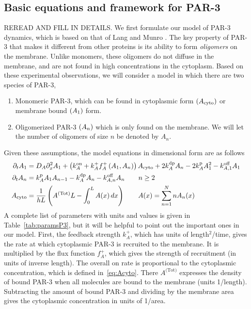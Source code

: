 \documentclass[11pt]{article}
\newcommand{\red}[1]{\color{red}#1\normalcolor}
\newcommand{\6}[1]{#1_{\text{6}}}
\newcommand{\3}[1]{#1_{\text{3}}}
\newcommand{\Tot}[1]{#1^\text{(Tot)}}
\newcommand{\A}[1]{#1_A}
\begin{document}
\subsection{Basic equations and framework for PAR-3 \label{sec:Par3}}
\red{REREAD AND FILL IN DETAILS.} We first formulate our model of PAR-3 dynamics, which is based on that of Lang and Munro \cite{lang2022oligomerization}. The key property of PAR-3 that makes it different from other proteins is its ability to form \emph{oligomers} on the membrane. Unlike monomers, these oligomers do not diffuse in the membrane, and are not found in high concentrations in the cytoplasm. Based on these experimental observations, we will consider a model in which there are two species of PAR-3, 
\begin{enumerate}
\item Monomeric PAR-3, which can be found in cytoplasmic form $(A_\text{cyto})$ or membrane bound $(A_1)$ form.
\item Oligomerized PAR-3 $(A_n)$ which is only found on the membrane. We will let the number of oligomers of size $n$ be denoted by $A_n$. 
\end{enumerate}
Given these assumptions, the model equations in dimensional form are as follows
\begin{subequations}
\label{eq:P3model}
\begin{align}
\Dt \MA & = \A{D} \Dx^2 \MA + \left(\A{\kon}+\A{\kf}\A{f}^+\left(\MA,\PA\right)\right)  \MAC + 2\A{\kdp}\PA -2\A{\kp} \MA^2 - \koff_{A,1}\MA \\
\Dt A_n & =\A{\kp}\MA A_{n-1}- \A{\kdp}A_n-\koff_{A,n}A_n \qquad n \geq 2 \\ \label{eq:Acyto}
A_\text{cyto} & = \frac{1}{h L} \left(\Tot{A} L - \int_0^L A(x) \, dx \right) \qquad A(x) =\sum_{n=1}^N n A_n(x)
\end{align}
\end{subequations}
A complete list of parameters with units and values is given in Table\ \ref{tab:paramsP3}, but it will be helpful to point out the important ones in our model. First, the feedback strength $k_A^+$, which has units of length$^2$/time, gives the rate at which cytoplasmic PAR-3 is recruited to the membrane. It is multiplied by the flux function $f_A^+$, which gives the strength of recruitment (in units of inverse length). The overall on rate is proportional to the cytoplasmic concentration, which is defined in\ \eqref{eq:Acyto}. There $\Tot{A}$ expresses the density of bound PAR-3 when all molecules are bound to the membrane (units 1/length). Subtracting the amount of bound PAR-3 and dividing by the membrane area gives
the cytoplasmic concentration in units of 1/area.
\end{document}
